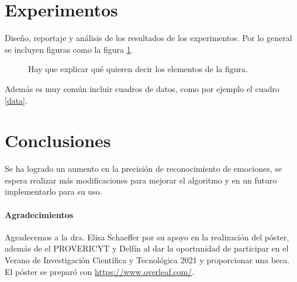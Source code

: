 \documentclass[a4]{sciposter}
\begin{document}
\begin{multicols}{2}
\section{Experimentos}

Diseño, reportaje y análisis de los resultados de los
experimentos. Por lo general se incluyen figuras como la figura
\ref{curvas}.

\begin{figure}
\setcounter{figure}{2} 
\captionsetup{type=figure} %
\begin{center}
   \end{center}
    \caption{Hay que explicar qué quieren decir los elementos de la figura.}
    \label{curvas}
\end{figure}

Además es muy común incluir cuadros de datos, como por ejemplo el cuadro \ref{data}.

\begin{table}
\setcounter{table}{0} %
\captionsetup{type=table} %
\caption{Aquí explicas cómo interpreta el cuadro.}
\label{data}
\begin{center}
\end{center}
\end{table}

\section{Conclusiones}

Se ha logrado un aumento en la precisión de reconocimiento de emociones, se espera realizar más modificaciones para mejorar el algoritmo y en un futuro implementarlo para su uso.

\paragraph{Agradecimientos}

{\small Agradecemos a la dra. Elisa Schaeffer por su apoyo en la realización del póster, además de el PROVERICYT y Delfín al dar la oportunidad de participar en el Verano de Investigación Científica y Tecnológica 2021 y proporcionar una beca.
El póster se preparó con \url{https://www.overleaf.com/}.}

\end{multicols}



\end{document}
